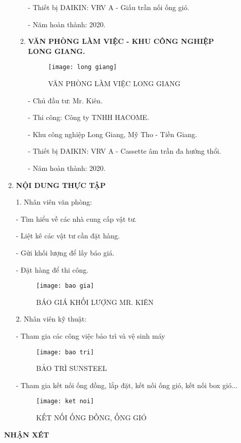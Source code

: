 \documentclass[12pt,a4paper]{article}
\newcommand{\Pointilles}[1]{%
  \par\nobreak
  \noindent\rule{0pt}{1.5\baselineskip} 
  \multido{}{#1}{\noindent\makebox[\linewidth]{\dotfill}\endgraf}
  \bigskip
}
\begin{document}
\begin{enumerate}
\begin{enumerate}
\hspace{1cm} - Thiết bị DAIKIN: VRV A - Giấu trần nối ống gió.

\hspace{1cm} - Năm hoàn thành: 2020.

\newpage
\item \textbf{VĂN PHÒNG LÀM VIỆC - KHU CÔNG NGHIỆP\\
 LONG GIANG.}
\begin{figure}[htbp]
  \centering
  \texttt{[image: long giang]}
  \caption{VĂN PHÒNG LÀM VIỆC LONG GIANG}
\end{figure}

\hspace{1cm} - Chủ đầu tư: Mr. Kiên.

\hspace{1cm} - Thi công: Công ty TNHH HACOME.

\hspace{1cm} - Khu công nghiệp Long Giang, Mỹ Tho - Tiền Giang.

\hspace{1cm} - Thiết bị DAIKIN: VRV A - Cassette âm trần đa hướng thổi.

\hspace{1cm} - Năm hoàn thành: 2020.
\end{enumerate}

\newpage
\item \textbf{NỘI DUNG THỰC TẬP}

1. Nhân viên văn phòng:

\hspace{1cm} - Tìm hiểu về các nhà cung cấp vật tư.

\hspace{1cm} - Liệt kê các vật tư cần đặt hàng.

\hspace{1cm} - Gửi khối lượng để lấy báo giá.

\hspace{1cm} - Đặt hàng để thi công.
	
\begin{figure}[htbp]
  \centering
  \texttt{[image: bao gia]}
  \caption{BÁO GIÁ KHỐI LƯỢNG MR. KIÊN }
\end{figure}

2. Nhân viên kỹ thuật:

\hspace{1cm} - Tham gia các công việc bảo trì và vệ sinh máy
\begin{figure}[htbp]
  \centering
  \texttt{[image: bao tri]}
  \caption{BẢO TRÌ SUNSTEEL }
\end{figure}

\newpage
\hspace{1cm} - Tham gia kết nối ống đồng, lắp đặt, kết nối ống gió, kết nối box gió...
\begin{figure}[htbp]
  \centering
  \texttt{[image: ket noi]}
  \caption{KẾT NỐI ỐNG ĐỒNG, ỐNG GIÓ }
\end{figure}
\end{enumerate}

\newpage
\begin{center}
  {\Huge \textbf{NHẬN XÉT }}
\end{center}
\Pointilles{44}
\end{document}
